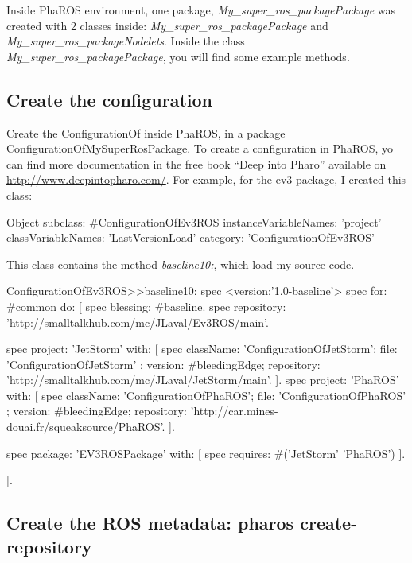 \documentclass[a4paper,10pt,twoside]{book}
\begin{document}
Inside PhaROS environment, one package, \emph{My\_super\_ros\_packagePackage} was created with 2 classes inside: \emph{My\_super\_ros\_packagePackage} and \emph{My\_super\_ros\_packageNodelets}. Inside the class \emph{My\_super\_ros\_packagePackage}, you will find some example methods.

\subsection{Create the configuration}

Create the ConfigurationOf inside PhaROS, in a package ConfigurationOfMySuperRosPackage. To create a configuration in PhaROS, yo can find more documentation in the free book ``Deep into Pharo'' available on \url{http://www.deepintopharo.com/}.  
For example, for the ev3 package, I created this class:

\begin{code}{}
Object subclass: #ConfigurationOfEv3ROS
	instanceVariableNames: 'project'
	classVariableNames: 'LastVersionLoad'
	category: 'ConfigurationOfEv3ROS'
\end{code}

This class contains the method \emph{baseline10:}, which load my source code. 

\begin{code}{}
ConfigurationOfEv3ROS>>baseline10: spec
	<version:'1.0-baseline'>
	spec for: #common do: [
			spec blessing: #baseline.
			spec repository: 'http://smalltalkhub.com/mc/JLaval/Ev3ROS/main'.
			
			spec project: 'JetStorm' with: [
				spec 
					className: 'ConfigurationOfJetStorm';
					file: 'ConfigurationOfJetStorm' ;
					version: #bleedingEdge;
					repository: 'http://smalltalkhub.com/mc/JLaval/JetStorm/main'.
			].
			spec project: 'PhaROS' with: [
				spec 
					className: 'ConfigurationOfPhaROS';
					file: 'ConfigurationOfPhaROS' ;
					version: #bleedingEdge;
					repository: 'http://car.mines-douai.fr/squeaksource/PhaROS'.
			].
		
			spec package: 'EV3ROSPackage' with: [ 
				spec requires: #('JetStorm' 'PhaROS')
			].
			
	].
\end{code}

\subsection{Create the ROS metadata: pharos create-repository}
\end{document}
